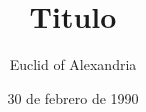 \documentclass{beamer}
\title{Titulo}
\date{30 de febrero de 1990}
\author{Euclid of Alexandria}
\begin{document}
\begin{frame}
\titlepage
\end{frame}
\end{document}
